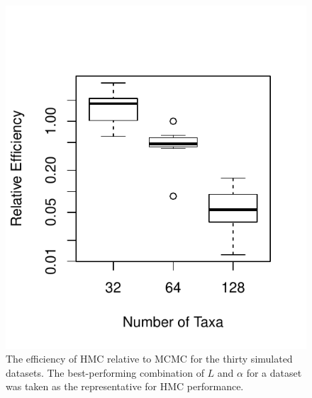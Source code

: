\documentclass{article}
\begin{document}
    \begin{figure}
        \centering
        \includegraphics[scale=0.8]{boxplot.pdf}
        \caption{The efficiency of \ac{HMC} relative to \ac{MCMC} for the
                 thirty simulated datasets. The best-performing combination of
                 $L$ and $\alpha$ for a dataset was taken as the representative
                 for \ac{HMC} performance.}
    \end{figure}
\end{document}
